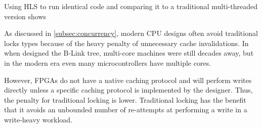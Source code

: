 Using HLS to run identical code and comparing it to a traditional multi-threaded
version shows \todo{\ldots}



As discussed in \autoref{subsec:concurrency}, modern CPU designs often avoid
traditional locks types because of the heavy penalty of unnecessary cache
invalidations. In \citeyear{b-link} when \citeauthor{b-link} designed the B-Link
tree, multi-core machines were still decades away, but in the modern era even
many microcontrollers have multiple cores.

However, FPGAs do not have a native caching protocol and will perform writes
directly unless a specific caching protocol is implemented by the designer.
Thus, the penalty for traditional locking is lower. Traditional locking has the
benefit that it avoids an unbounded number of re-attempts at performing a write
in a write-heavy workload.




